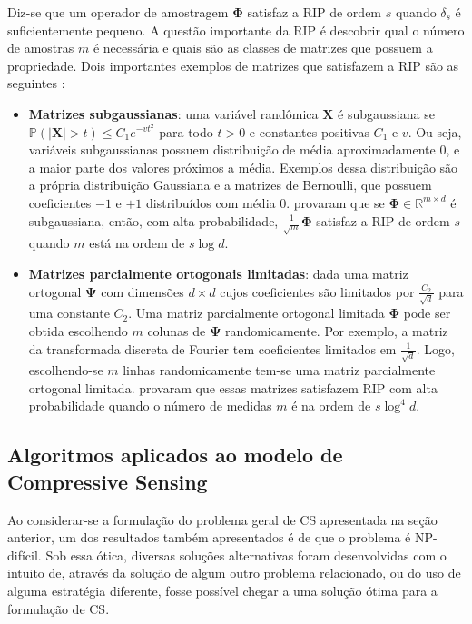 \documentclass[cic,tc]{iiufrgs}
\newcommand{\mat}[1]{\bm{#1}}
\begin{document}
Diz-se que um operador de amostragem $\mathbf{\Phi}$ satisfaz a RIP de ordem $s$ quando $\delta_s$ é suficientemente
pequeno. %
A questão importante da RIP é descobrir qual o número de amostras $m$ é necessária e quais são as 
classes de matrizes que possuem a propriedade. Dois importantes exemplos de matrizes que satisfazem a RIP são
as seguintes \cite{chen2015compressed}: 
\begin{itemize}
    \item \textbf{Matrizes subgaussianas}: uma variável randômica $\mat{X}$ é subgaussiana se 
    $\mathbb{P}(|\mat{X}| > t) \le C_1e^{-vt^2}$ para todo $t>0$ e constantes positivas $C_1$ e $v$. Ou seja,
    variáveis subgaussianas possuem distribuição de média aproximadamente $0$, e a maior parte dos valores
    próximos a média. Exemplos dessa distribuição são a própria distribuição Gaussiana e a matrizes de 
    Bernoulli, que possuem coeficientes $-1$ e $+1$ distribuídos com média $0$. \citet{Mendelson2008} provaram que
    se $\mat{\Phi} \in \mathbb{R}^{m\times d}$ é subgaussiana, então, com alta probabilidade, $\frac{1}{\sqrt{m}}\mat{\Phi}$
    satisfaz a RIP de ordem $s$ quando $m$ está na ordem de $s\log{d}$.
    \item \textbf{Matrizes parcialmente ortogonais limitadas}: dada uma matriz ortogonal $\mat{\Psi}$ com dimensões $d\times d$
    cujos coeficientes são limitados por $\frac{C_2}{\sqrt{d}}$ para uma constante $C_2$. Uma matriz parcialmente
    ortogonal limitada $\mat{\Phi}$ pode ser obtida escolhendo $m$ colunas de $\mat{\Psi}$ randomicamente.
    Por exemplo, a matriz da transformada discreta de Fourier tem coeficientes limitados em $\frac{1}{\sqrt{d}}$.
    Logo, escolhendo-se $m$ linhas randomicamente tem-se uma matriz parcialmente ortogonal limitada.
    \citet{rudelson2008sparse} provaram que essas matrizes satisfazem RIP com alta probabilidade quando
    o número de medidas $m$ é na ordem de $s\log^4{d}$.
\end{itemize}


\subsection{Algoritmos aplicados ao modelo de Compressive Sensing}
\label{sec:csalgo}
Ao considerar-se a formulação do problema geral de CS apresentada na seção anterior, um dos resultados também apresentados
é de que o problema é NP-difícil. Sob essa ótica, diversas soluções alternativas foram desenvolvidas com 
o intuito de, através da solução de algum outro problema relacionado, ou do uso de alguma estratégia diferente, fosse possível 
chegar a uma solução ótima para a formulação de CS. 
\end{document}
